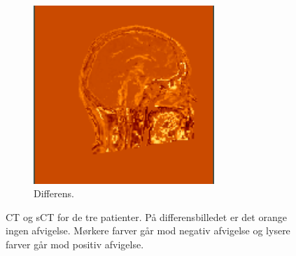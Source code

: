 \begin{figure}
\begin{subfigure}{0.3\textwidth}
        \includegraphics[width=0.75\textwidth]{colager/over_tid_sct/over_tid_sct_210445_sub.png}
        \caption{Differens.}
        \label{col:over_time_sct_pat3_sub}
    \end{subfigure}
    \caption{CT og sCT for de tre patienter. På differensbilledet er det orange ingen afvigelse. Mørkere farver går mod negativ afvigelse og lysere farver går mod positiv afvigelse.}
    \label{col:over_time_sct}
\end{figure}

